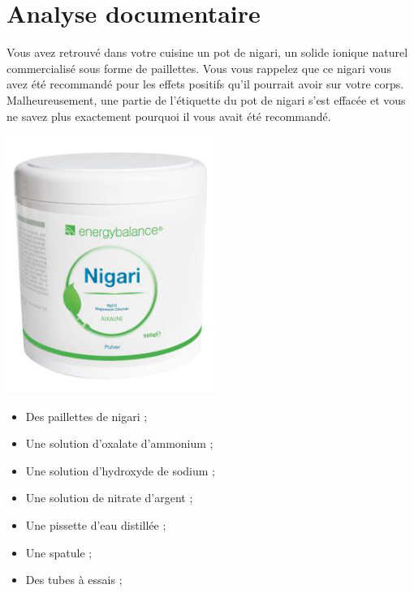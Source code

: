\section{Analyse documentaire}
\begin{tcolorbox}[colback=orange!5!white,colframe=orange!75!black,title= Contexte : à quoi sert le nigari ? :]

\begin{minipage}{0.75\textwidth}
    Vous avez retrouvé dans votre cuisine un pot de nigari, un solide ionique naturel commercialisé sous forme de paillettes. Vous vous rappelez que ce nigari vous avez été recommandé pour les effets positifs qu'il pourrait avoir sur votre corps. Malheureusement, une partie de l’étiquette du pot de nigari s’est effacée et vous ne savez plus exactement pourquoi il vous avait été recommandé. 
\end{minipage}
\begin{minipage}{0.2\textwidth}
\begin{center}
    \includegraphics[scale=0.7]{Images/Nigari.PNG}
\end{center}
    
\end{minipage}

\end{tcolorbox}


\begin{mdframed}[style=autreexo]
\textbf{}
\vspace{-0.5cm}
\begin{multicols}{2}
\begin{itemize}
    \item Des paillettes de nigari ;
    \item Une solution d'oxalate d'ammonium ;
    \item Une solution d'hydroxyde de sodium ;
    \item Une solution de nitrate d'argent ;
    \item Une pissette d'eau distillée ; 
    \item Une spatule ;
    \item Des tubes à essais ;
\end{itemize}
\end{multicols}
\end{mdframed}
\clearpage

